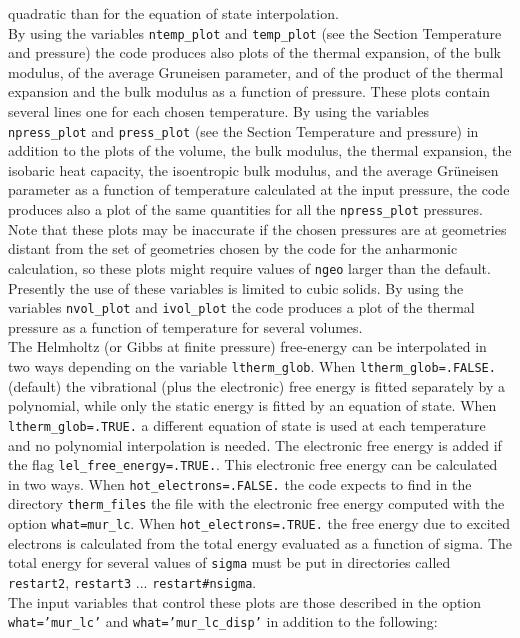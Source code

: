 \documentclass[12pt,a4paper,twoside]{report}
\begin{document}
quadratic than for the equation of state interpolation. \\
By using the variables \texttt{ntemp\_plot} and \texttt{temp\_plot} (see
the Section Temperature and pressure) the code produces also plots
of the thermal expansion, of the bulk modulus, of the average 
Gruneisen parameter, and of the product of the thermal expansion
and the bulk modulus as a function of pressure. These plots contain
several lines one for each chosen temperature.
By using the variables \texttt{npress\_plot} and \texttt{press\_plot} (see
the Section Temperature and pressure) in addition to the plots of
the volume, the bulk modulus, the thermal expansion, the 
isobaric heat capacity, 
the isoentropic bulk modulus, and the average Gr\"uneisen parameter 
as a function of temperature calculated at the input pressure, the code
produces also a plot of the same quantities for all the \texttt{npress\_plot}
pressures. Note that these plots may be inaccurate if the chosen
pressures are at geometries distant from the set of geometries chosen
by the code for the anharmonic calculation, so these plots might
require values of \texttt{ngeo} larger than the default. Presently the
use of these variables is limited to cubic solids.
By using the variables \texttt{nvol\_plot} and \texttt{ivol\_plot} the
code produces a plot of the thermal pressure as a function of temperature
for several volumes. \\
The Helmholtz (or Gibbs at finite pressure) free-energy can be interpolated
in two ways depending on the variable \texttt{ltherm\_glob}. 
When \texttt{ltherm\_glob=.FALSE.} (default) the vibrational (plus 
the electronic) free energy is fitted separately by a polynomial, while
only the static energy is fitted by an equation of state. When
 \texttt{ltherm\_glob=.TRUE.} a different equation of state is used 
at each temperature and no polynomial interpolation is needed.
The electronic free energy is added if the flag 
\texttt{lel\_free\_energy=.TRUE.}. This electronic free energy can be 
calculated in two ways. When \texttt{hot\_electrons=.FALSE.} the code 
expects to find in the directory \texttt{therm\_files} the file with 
the electronic free energy computed with the option \texttt{what=mur\_lc}.
When \texttt{hot\_electrons=.TRUE.} the free energy due to excited
electrons is calculated from the total energy evaluated as a function
of sigma. The total energy for several values of \texttt{sigma} must
be put in directories called \texttt{restart2}, \texttt{restart3} ...
\texttt{restart\#nsigma}. \\
The input variables that control these plots are those described in the option
\texttt{what='mur\_lc'} and \texttt{what='mur\_lc\_disp'} in addition to the 
following:
\end{document}
